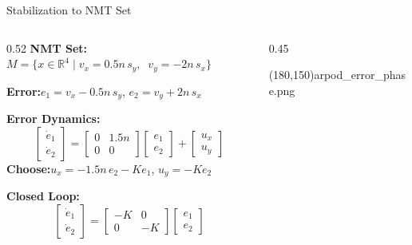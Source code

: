 \begin{frame}{Stabilization to NMT Set}
  \hypertarget{backup:nmt-stabilization}{}
  \footnotesize
  \begin{columns}[c]
    \begin{column}{0.52\textwidth}
      \textbf{NMT Set:}\quad $M = \{x \in \mathbb{R}^4 \mid v_x = 0.5n\, s_y,\;\; v_y = -2n\, s_x\}$

      \vskip2pt
      \textbf{Error:}\quad $e_1 = v_x - 0.5n\, s_y$, \quad $e_2 = v_y + 2n\, s_x$

      \vskip2pt
      \textbf{Error Dynamics:}
      \vskip-6pt
      \scriptsize
      \[ \begin{bmatrix} \dot{e}_1 \\ \dot{e}_2 \end{bmatrix} = \begin{bmatrix} 0 & 1.5n \\ 0 & 0 \end{bmatrix} \begin{bmatrix} e_1 \\ e_2 \end{bmatrix} + \begin{bmatrix} u_x \\ u_y \end{bmatrix} \]
      \vskip0pt
      \footnotesize
      \textbf{Choose:}\quad $u_x = -1.5n\, e_2 - K e_1$, \quad $u_y = -K e_2$

      \vskip2pt
      \textbf{Closed Loop:}
      \vskip-6pt
      \scriptsize
      \[ \begin{bmatrix} \dot{e}_1 \\ \dot{e}_2 \end{bmatrix} = \begin{bmatrix} -K & 0 \\ 0 & -K \end{bmatrix} \begin{bmatrix} e_1 \\ e_2 \end{bmatrix} \]
    \end{column}
    \begin{column}{0.45\textwidth}
      \begin{center}
        {\color{slate400}\framebox(180,150){arpod\_error\_phase.png}}
      \end{center}
    \end{column}
  \end{columns}
\end{frame}

